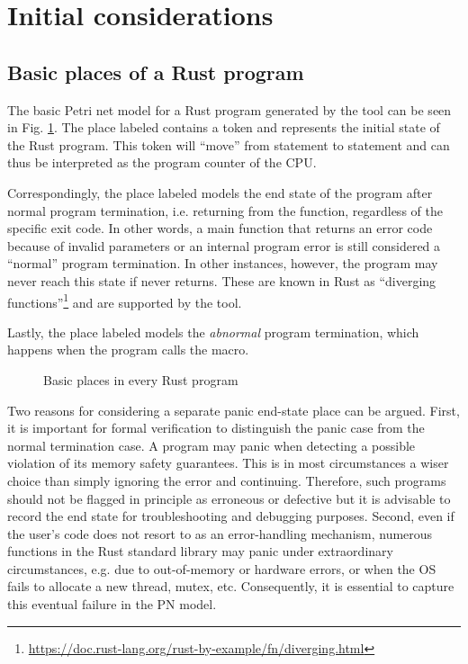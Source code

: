 \section{Initial considerations}

\subsection{Basic places of a Rust program}

The basic Petri net model for a Rust program generated by the tool
can be seen in Fig. \ref{fig:program-places}.
The place labeled  contains a token
and represents the initial state of the Rust program.
This token will ``move'' from statement to statement
and can thus be interpreted as the program counter of the \acrshort{CPU}.

Correspondingly, the place labeled  models
the end state of the program after normal program termination,
i.e. returning from the  function,
regardless of the specific exit code.
In other words, a main function that returns an error code because of invalid parameters
or an internal program error is still considered a ``normal'' program termination.
In other instances, however, the program may never reach this state
if  never returns.
These are known in Rust as ``diverging
functions''\footnote{\url{https://doc.rust-lang.org/rust-by-example/fn/diverging.html}}
and are supported by the tool.

Lastly, the place labeled  models
the \emph{abnormal} program termination,
which happens when the program calls the  macro.

\begin{figure}[!htb]
  \centering
  
  \caption{Basic places in every Rust program}
  \label{fig:program-places}
\end{figure}

Two reasons for considering a separate panic end-state place can be argued.
First, it is important for formal verification to distinguish the panic case
from the normal termination case.
A program may panic when detecting a possible violation of its memory safety guarantees.
This is in most circumstances a wiser choice than simply ignoring the error and continuing.
Therefore, such programs should not be flagged in principle as erroneous or defective but
it is advisable to record the end state for troubleshooting and debugging purposes.
Second, even if the user's code does not resort to 
as an error-handling mechanism, numerous functions in the Rust standard library
may panic under extraordinary circumstances, e.g. due to out-of-memory or hardware errors,
or when the \acrshort{OS} fails to allocate a new thread, mutex, etc.
Consequently, it is essential to capture this eventual failure in the \acrshort{PN} model.

